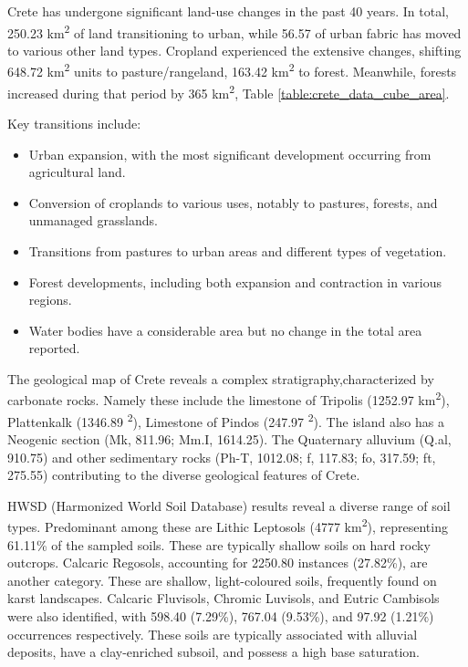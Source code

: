 Crete has undergone significant land-use changes in the past 40 years. In total, 250.23 km\textsuperscript{2}
of land transitioning to urban, while 56.57 of urban fabric has moved to various other land types.
Cropland experienced the extensive changes, shifting 648.72 km\textsuperscript{2}
units to pasture/rangeland, 163.42 km\textsuperscript{2} to forest.
Meanwhile, forests increased during that period by 365 km\textsuperscript{2}, Table \ref{table:crete_data_cube_area}.

Key transitions include:
\begin{itemize}
    \item Urban expansion, with the most significant development occurring from agricultural land.
    \item Conversion of croplands to various uses, notably to pastures, forests, and unmanaged grasslands.
    \item Transitions from pastures to urban areas and different types of vegetation.
    \item Forest developments, including both expansion and contraction in various regions.
    \item Water bodies have a considerable area but no change in the total area reported.
\end{itemize}

The geological map of Crete reveals a complex stratigraphy,characterized by carbonate
rocks. Namely these include the limestone of Tripolis (1252.97 km\textsuperscript{2}),
Plattenkalk (1346.89 \textsuperscript{2}), Limestone of Pindos (247.97 \textsuperscript{2}).
The island also has a Neogenic section (Mk, 811.96; Mm.I, 1614.25). The
Quaternary alluvium (Q.al, 910.75) and other sedimentary rocks (Ph-T, 1012.08; f, 117.83; fo, 317.59; ft, 275.55)
contributing to the diverse geological features of Crete.

HWSD (Harmonized World Soil Database) results reveal a diverse range of soil types.
Predominant among these are Lithic Leptosols (4777 km\textsuperscript{2}),
representing 61.11\% of the sampled soils.
These are typically shallow soils on hard rocky outcrops.
Calcaric Regosols, accounting for 2250.80 instances (27.82\%),
are another category. These are shallow, light-coloured soils, frequently
found on karst landscapes.
Calcaric Fluvisols, Chromic Luvisols, and Eutric Cambisols were also
identified, with 598.40 (7.29\%), 767.04 (9.53\%), and 97.92 (1.21\%) occurrences
respectively. These soils are typically associated with alluvial deposits, have
a clay-enriched subsoil, and possess a high base saturation.

